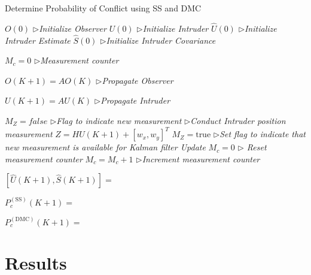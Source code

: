 \documentclass[journal]{IEEEtran}
\begin{document}
\begin{algorithm}[!t]
\caption{Determine Probability of Conflict using SS and DMC}
\label{alg:pc_ss_dmc}
\begin{algorithmic}[1]
\State $O(0)$ \textit{$\triangleright$Initialize Observer}
\State $U(0)$ \textit{$\triangleright$Initialize Intruder}
\State $\hat{U}(0)$ \textit{$\triangleright$Initialize Intruder Estimate}
\State $\hat{S}(0)$ \textit{$\triangleright$Initialize Intruder Covariance}

\State $M_{c} = 0$ \textit{$\triangleright$Measurement counter}

	
\State $O(K+1) = AO(K)$ \textit{$\triangleright$Propagate Observer}
		
\State $U(K+1) = AU(K)$ \textit{$\triangleright$Propagate Intruder}
		
\State $M_{Z} = false$ \textit{$\triangleright$Flag to indicate new measurement}
		 \textit{$\triangleright$Conduct Intruder position measurement}
			\State $Z = HU(K+1) + [w_{x},w_{y}]^{T}$
				\State $M_{Z} = \text{true}$ \textit{$\triangleright$Set flag to indicate that new measurement is available for Kalman filter Update}
				\State $M_{c} = 0$ \textit{$\triangleright$ Reset measurement counter}
		\EndIf
		\State $M_{c} = M_{c} + 1$ \textit{$\triangleright$Increment measurement counter}
		
		\State $[\hat{U}(K+1), \hat{S}(K+1)] = $ 
		
		
\State $P_{c}^{(\text{SS})}(K+1) = $
		
		
\State $P_{c}^{(\text{DMC})}(K+1) = $
		
	\EndFor
\end{algorithmic}
\end{algorithm}

\section{Results}
\label{sec:results}
\end{document}
